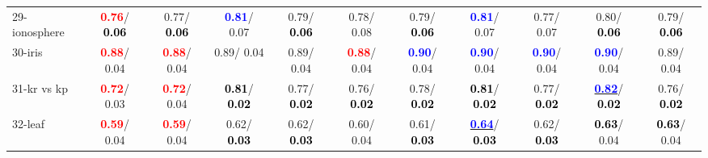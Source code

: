 \begin{table}[h]
\begin{center}
{\begin{tabular}{lc|c|c|c|c|c|c|c|c|c}
29-ionosphere & \textcolor{red}{\textbf{  0.76}}/\textcolor{black}{\textbf{  0.06}} &   0.77/\textcolor{black}{\textbf{  0.06}} & \textcolor{blue}{\textbf{  0.81}}/  0.07 &   0.79/\textcolor{black}{\textbf{  0.06}} &   0.78/  0.08 &   0.79/\textcolor{black}{\textbf{  0.06}} & \textcolor{blue}{\textbf{  0.81}}/  0.07 &   0.77/  0.07 &   0.80/\textcolor{black}{\textbf{  0.06}} &   0.79/\textcolor{black}{\textbf{  0.06}} \\
30-iris & \textcolor{red}{\textbf{  0.88}}/  0.04 & \textcolor{red}{\textbf{  0.88}}/  0.04 &   0.89/  0.04 &   0.89/  0.04 & \textcolor{red}{\textbf{  0.88}}/  0.04 & \textcolor{blue}{\textbf{  0.90}}/  0.04 & \textcolor{blue}{\textbf{  0.90}}/  0.04 & \textcolor{blue}{\textbf{  0.90}}/  0.04 & \textcolor{blue}{\textbf{  0.90}}/  0.04 &   0.89/  0.04 \\
31-kr vs kp & \textcolor{red}{\textbf{  0.72}}/  0.03 & \textcolor{red}{\textbf{  0.72}}/  0.04 & \textcolor{black}{\textbf{  0.81}}/\textcolor{black}{\textbf{  0.02}} &   0.77/\textcolor{black}{\textbf{  0.02}} &   0.76/\textcolor{black}{\textbf{  0.02}} &   0.78/\textcolor{black}{\textbf{  0.02}} & \textcolor{black}{\textbf{  0.81}}/\textcolor{black}{\textbf{  0.02}} &   0.77/\textcolor{black}{\textbf{  0.02}} & \underline{\textcolor{blue}{\textbf{  0.82}}}/\textcolor{black}{\textbf{  0.02}} &   0.76/\textcolor{black}{\textbf{  0.02}} \\
32-leaf & \textcolor{red}{\textbf{  0.59}}/  0.04 & \textcolor{red}{\textbf{  0.59}}/  0.04 &   0.62/\textcolor{black}{\textbf{  0.03}} &   0.62/\textcolor{black}{\textbf{  0.03}} &   0.60/  0.04 &   0.61/\textcolor{black}{\textbf{  0.03}} & \underline{\textcolor{blue}{\textbf{  0.64}}}/\textcolor{black}{\textbf{  0.03}} &   0.62/\textcolor{black}{\textbf{  0.03}} & \textcolor{black}{\textbf{  0.63}}/  0.04 & \textcolor{black}{\textbf{  0.63}}/  0.04 \\\end{tabular}}\label{stratsALCKappa0aRFRedux}
\end{center}
\end{table}

